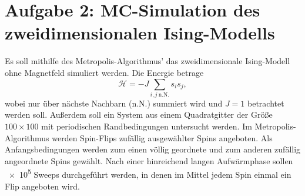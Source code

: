 
\section*{Aufgabe 2: MC-Simulation des zweidimensionalen Ising-Modells}
Es soll mithilfe des Metropolis-Algorithmus' das zweidimensionale Ising-Modell ohne Magnetfeld simuliert werden.
Die Energie betrage \[\mathcal{H}=-J\sum_{i,j~\text{n.N.}}s_is_j,\]
wobei nur über nächste Nachbarn (n.N.) summiert wird und $J=1$ betrachtet werden soll.
Außerdem soll ein System aus einem Quadratgitter der Größe $100\times100$ mit periodischen Randbedingungen untersucht werden.
Im Metropolis-Algorithmus werden Spin-Flips zufällig ausgewählter Spins angeboten.
Als Anfangsbedingungen werden zum einen völlig geordnete und zum anderen zufällig angeordnete Spins gewählt.
Nach einer hinreichend langen Aufwärmphase sollen \num{e5} Sweeps durchgeführt werden, in denen im Mittel jedem Spin einmal ein Flip angeboten wird.
